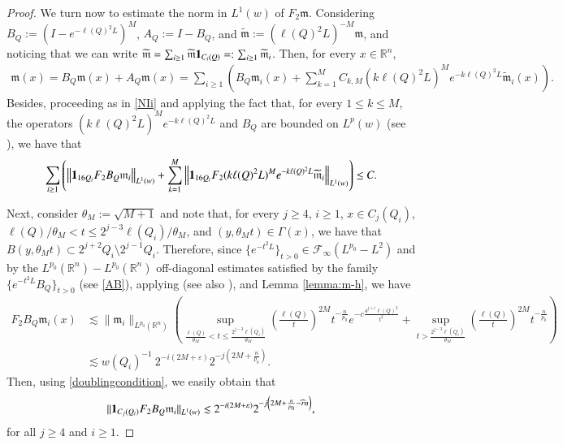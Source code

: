 \documentclass[11pt, a4paper,leqno]{amsart}
\newcommand{\mm}{\mathfrak{m}}
\renewcommand{\chi}{{\bf 1}}
\theoremstyle{plain}
\theoremstyle{definition}
\theoremstyle{remark}
\numberwithin{equation}{section}
\def \R{ \mathbb{R} }
\begin{document}
\begin{proof}
We turn now to estimate the norm in $L^1(w)$ of $F_2\mm$. Considering
$
B_Q:=(I-e^{-\ell(Q)^2L})^M$, $A_Q:=I-B_Q
$, and $\widetilde{\mm}:=(\ell(Q)^2L)^{-M}\mm$,
and noticing that we can write $\widetilde{\mm}=\sum_{i\geq 1}\widetilde{\mm}\chi_{C_i(Q)}=:\sum_{i\geq 1}\widetilde{\mm}_i$. Then, for every $x\in \R^n$,
\begin{align*}
\mm(x)=B_Q\mm(x)+A_Q\mm(x)= \sum_{i\geq 1}	\left(B_Q\mm_i(x)+\sum_{k=1}^{M}C_{k,M}(k\ell(Q)^2L)^Me^{-k\ell(Q)^2L}\widetilde{\mm}_i(x)\right).
\end{align*} 
Besides, proceeding as in \eqref{NIi} and applying the fact that, for every $1\leq k\leq M$, the operators  $(k\ell(Q)^2L)^Me^{-k\ell(Q)^2L}$ and $B_Q$ are bounded on $L^p(w)$ (see \cite{AuscherMartell:II}), we have that
\begin{align}\label{F2local}
\sum_{i\geq 1}\left(\left\|\chi_{16Q_i}F_2B_Q\mm_i\right\|_{L^1(w)}+\sum_{k=1}^M\left\|\chi_{16Q_i}F_2(k\ell(Q)^2L)^Me^{-k\ell(Q)^2L}\widetilde{\mm}_i\right\|_{L^1(w)}\right)
\leq C.
\end{align}
 
 
Next, consider $\theta_M:=\sqrt{M+1}$ and note that, for every $j\geq 4$, $i\geq 1$, $x\in C_{j}(Q_i)$, $\ell(Q)/\theta_M<t\leq 2^{j-3}\ell(Q_i)/\theta_M$, and $(y,\theta_M t)\in \Gamma(x)$, we have that
$B(y,\theta_Mt)\subset 2^{j+2}Q_i\setminus 2^{j-1}Q_i$.
Therefore, since $\{e^{-t^2L}\}_{t>0}\in\mathcal{F}_{\infty}(L^{p_0}-L^2)$ and by the $L^{p_0}(\R^n)-L^{p_0}(\R^n)$ off-diagonal estimates satisfied by the family $\{e^{-t^2L}B_Q\}_{t>0}$ (see \eqref{AB}), applying \cite[Lemma 2.1]{MartellPrisuelos} (see also \cite[Lemma 2.3]{HofmannMartell}), and Lemma \ref{lemma:m-h}, we have
\begin{align*}
F_2B_Q\mm_i(x)
&\lesssim \|\mm_i\|_{L^{p_0}(\R^n)}
\left(\sup_{\frac{\ell(Q)}{\theta_M}<t\leq \frac{2^{j-3}\ell(Q_i)}{\theta_M}}
\left(\frac{\ell(Q)}{t}\right)^{2M}t^{-\frac{n}{p_0}}e^{-c\frac{4^{j+i}\ell(Q)^2}{t^2}}
+\sup_{t>\frac{2^{j-3}\ell(Q_i)}{\theta_M}}\left(\frac{\ell(Q)}{t}\right)^{2M}t^{-\frac{n}{p_0}}\right)
\\&
\lesssim w(Q_i)^{-1}\
2^{-i\left(2M+\varepsilon\right)}2^{-j\left(2M+\frac{n}{p_0}\right)}
.
\end{align*}
Then, using \eqref{doublingcondition}, we easily obtain that
\begin{align}\label{NhF2-BQ}
\|\chi_{C_j(Q_i)}F_2B_Q\mm_i\|_{L^1(w)}\lesssim 
2^{-i\left(2M+\varepsilon\right)}2^{-j\left(2M+\frac{n}{p_0}-\widehat{r}n\right)},
\end{align}
for all  $j\geq 4$ and $i\geq 1$.


\end{proof}
\end{document}
